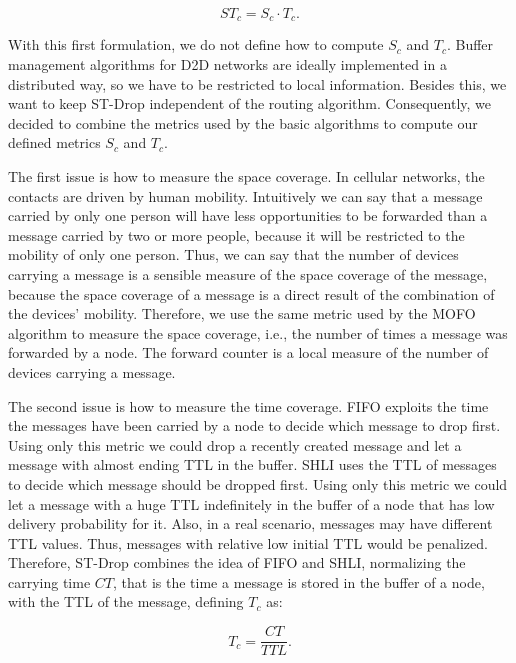 \begin{equation}
    ST_{c} = S_{c} \cdot T_{c}.
\end{equation}

With this first formulation, we do not define how to compute $S_c$ and $T_c$. Buffer management algorithms for D2D networks are ideally implemented in a distributed way, so we have
to be restricted to local information. Besides this, we want to keep ST-Drop independent of the routing algorithm. Consequently, we decided to combine the metrics used by the basic
algorithms to compute our defined metrics $S_c$ and $T_c$.

The first issue is how to measure the space coverage. In cellular networks, the contacts are driven by human mobility. Intuitively we can say that a message carried by only one person
will have less opportunities to be forwarded than a message carried by two or more people, because it will be restricted to the mobility of only one person. Thus, we can say that the
number of devices carrying a message is a sensible measure of the space coverage of the message, because the space coverage of a message is a direct result of the combination of the
devices' mobility. Therefore, we use the same metric used by the MOFO algorithm to measure the space coverage, i.e., the number of times a message was forwarded by a node.
The forward counter is a local measure of the number of devices carrying a message.

The second issue is how to measure the time coverage. FIFO exploits the time the messages have been carried by a node to decide which message to drop first.
Using only this metric we could drop a recently created message and let a message with almost ending TTL in the buffer. SHLI uses the TTL of messages to decide
which message should be dropped first. Using only this metric we could let a message with a huge TTL indefinitely in the buffer of a node that has low delivery
probability for it. Also, in a real scenario, messages may have different TTL values. Thus, messages with relative low initial TTL would be penalized. Therefore,
ST-Drop combines the idea of FIFO and SHLI, normalizing the carrying time $CT$, that is the time a message is stored in the buffer of a node, with the TTL of the message,
defining $T_{c}$ as:

\begin{equation}
    T_{c} = \frac{CT}{TTL}.
\end{equation}

